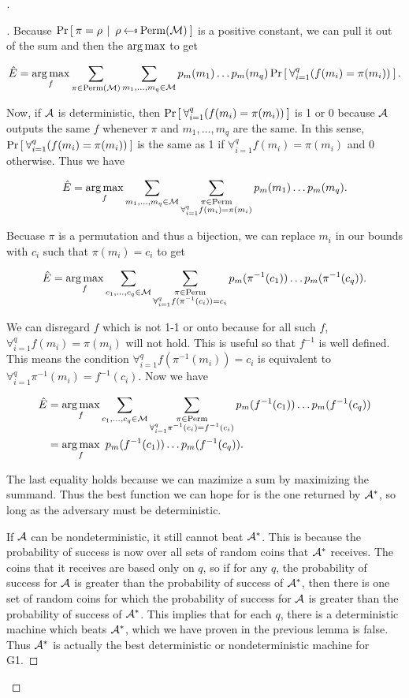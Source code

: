 \begin{proof}[]
\begin{proof}[]
Because $\CondProb{\pi=\rho}{\rho\getsr\Perm(\msgspace)} $ is a positive constant, we can pull it out of the sum and then the $\operatorname*{arg\,max}$ to get

$$\hat{E}=\operatorname*{arg\,max}_f \sum_{\pi\in\mathrm{Perm}({\cal M})}\sum_{m_1, \ldots,m_q\in {\cal M}} p_m(m_1)\ldots p_m(m_q)\Pr\left[\: \forall_{i=1}^q (f(m_i)=\pi(m_i)) \:\right].$$

 Now, if ${\mathcal A}$ is deterministic, then $\Pr\left[\: \forall_{i=1}^q (f(m_i)=\pi(m_i)) \:\right]$ is 1 or 0 because ${\mathcal A}$ outputs the same $f$ whenever $\pi$ and $m_1,\ldots,m_q$ are the same. In this sense, $\Pr\left[\: \forall_{i=1}^q (f(m_i)=\pi(m_i)) \:\right]$ is the same as 1 if $\forall_{i=1}^q f(m_i)=\pi(m_i)$ and 0 otherwise. Thus we have

$$\hat{E}=\operatorname*{arg\,max}_f \sum_{m_1, \ldots,m_q\in {\cal M} }\sum_{\substack{\pi\in\mathrm{Perm} \\ \forall_{i=1}^q f(m_i)=\pi(m_i)}} p_m(m_1)\ldots p_m(m_q).$$

Becuase $\pi$ is a permutation and thus a bijection, we can replace $m_i$ in our bounds with $c_i$ such that $\pi(m_i)=c_i$ to get 

$$\hat{E}=\operatorname*{arg\,max}_f \sum_{c_1, \ldots,c_q\in {\cal M} }\sum_{\substack{\pi\in\mathrm{Perm} \\\forall_{i=1}^q f(\pi^{-1}(c_i))=c_i}} p_m(\pi^{-1}(c_1))\ldots p_m(\pi^{-1}(c_q)).$$

We can disregard $f$ which is not 1-1 or onto because for all such $f$,  $\forall_{i=1}^q f(m_i)=\pi(m_i)$ will not hold. This is useful so that $f^{-1}$ is well defined. This means the condition $\forall_{i=1}^q f(\pi^{-1}(m_i))=c_i$ is equivalent to $\forall_{i=1}^q \pi^{-1}(m_i)=f^{-1}(c_i)$. Now we have

\begin{align*}
   \hat{E}&=\operatorname*{arg\,max}_f \sum_{c_1, \ldots,c_q\in {\cal M} }\sum_{\substack{\pi\in\mathrm{Perm} \\\forall_{i=1}^q \pi^{-1}(c_i)=f^{-1}(c_i)}} p_m(f^{-1}(c_1))\ldots p_m(f^{-1}(c_q))\\
    &=\operatorname*{arg\,max}_f \textrm{ }  p_m(f^{-1}(c_1))\ldots p_m(f^{-1}(c_q)).
\end{align*}


The last equality holds because we can mazimize a sum by maximizing the summand. Thus the best function we can hope for is the one returned by ${\mathcal A}^*$, so long as the adversary must be deterministic.

If ${\mathcal A}$ can be nondeterministic, it still cannot beat ${\mathcal A}^*$. This is because the probability of success is now over all sets of random coins that ${\mathcal A}^*$ receives. The coins that it receives are based only on $q$, so if for any $q$, the probability of success for ${\mathcal A}$ is greater than the probability of success of ${\mathcal A}^*$, then there is one set of random coins for which the probability of success for ${\mathcal A}$ is greater than the probability of success of ${\mathcal A}^*$. This implies that for each $q$, there is a deterministic machine which beats ${\mathcal A}^*$, which we have proven in the previous lemma is false. Thus ${\mathcal A}^*$ is actually the best deterministic or nondeterministic machine for G1.
\end{proof}


\end{proof}
